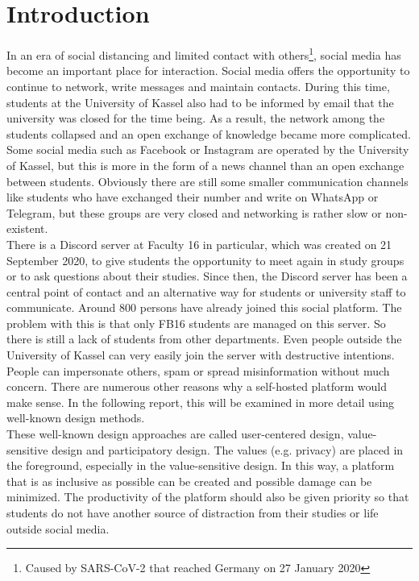 \section{Introduction}\label{sec:introduction}
In an era of social distancing and limited contact with others\footnote{Caused by SARS-CoV-2 that reached Germany on 27 January 2020\cite{bundesgesundheitsministerium-corona}}, social media has become an important place for interaction.
Social media offers the opportunity to continue to network, write messages and maintain contacts.
During this time, students at the University of Kassel also had to be informed by email that the university was closed for the time being.
As a result, the network among the students collapsed and an open exchange of knowledge became more complicated.
Some social media such as Facebook or Instagram are operated by the University of Kassel, but this is more in the form of a news channel than an open exchange between students.
Obviously there are still some smaller communication channels like students who have exchanged their number and write on WhatsApp or Telegram, but these groups are very closed and networking is rather slow or non-existent.\\

There is a Discord server at Faculty 16 in particular, which was created on 21 September 2020, to give students the opportunity to meet again in study groups or to ask questions about their studies.
Since then, the Discord server has been a central point of contact and an alternative way for students or university staff to communicate.
Around 800 persons have already joined this social platform.
The problem with this is that only FB16 students are managed on this server.
So there is still a lack of students from other departments.
Even people outside the University of Kassel can very easily join the server with destructive intentions.
People can impersonate others, spam or spread misinformation without much concern.
There are numerous other reasons why a self-hosted platform would make sense.
In the following report, this will be examined in more detail using well-known design methods.\\

These well-known design approaches are called user-centered design, value-sensitive design and participatory design.
The values (e.g. privacy) are placed in the foreground, especially in the value-sensitive design.
In this way, a platform that is as inclusive as possible can be created and possible damage can be minimized.
The productivity of the platform should also be given priority so that students do not have another source of distraction from their studies or life outside social media.
